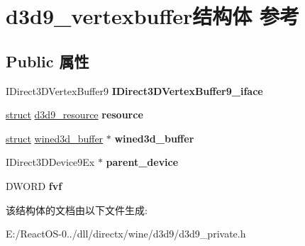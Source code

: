 \hypertarget{structd3d9__vertexbuffer}{}\section{d3d9\+\_\+vertexbuffer结构体 参考}
\label{structd3d9__vertexbuffer}
\subsection*{Public 属性}
\begin{DoxyCompactItemize}
\item 
\mbox{\label{structd3d9__vertexbuffer_a1b73a6d2dcedceb216be2f85a3f705d3}} 
I\+Direct3\+D\+Vertex\+Buffer9 {\bfseries I\+Direct3\+D\+Vertex\+Buffer9\+\_\+iface}
\item 
\mbox{\label{structd3d9__vertexbuffer_ad8ba4c96a89696113bb94bfad6b7aefb}} 
\hyperlink{interfacestruct}{struct} \hyperlink{structd3d9__resource}{d3d9\+\_\+resource} {\bfseries resource}
\item 
\mbox{\label{structd3d9__vertexbuffer_add99685e1330f2ffcc88640f3af7393b}} 
\hyperlink{interfacestruct}{struct} \hyperlink{structwined3d__buffer}{wined3d\+\_\+buffer} $\ast$ {\bfseries wined3d\+\_\+buffer}
\item 
\mbox{\label{structd3d9__vertexbuffer_add801144a7d0a470b6a3addddb1b720f}} 
I\+Direct3\+D\+Device9\+Ex $\ast$ {\bfseries parent\+\_\+device}
\item 
\mbox{\label{structd3d9__vertexbuffer_a27c02ac672f1d04b9979741514dda9db}} 
D\+W\+O\+RD {\bfseries fvf}
\end{DoxyCompactItemize}


该结构体的文档由以下文件生成\+:\begin{DoxyCompactItemize}
\item 
E\+:/\+React\+O\+S-\/0../dll/directx/wine/d3d9/d3d9\+\_\+private.\+h\end{DoxyCompactItemize}
